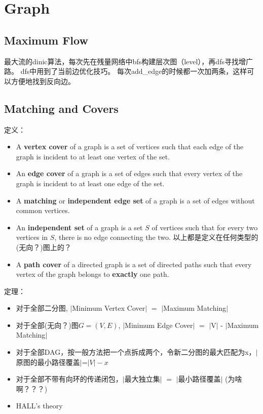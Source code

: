 \documentclass[twoside, UTF8]{article}
\begin{document}
	\section{Graph}
		\subsection{Maximum Flow}
			\begin{flushleft}
				最大流的dinic算法，每次先在残量网络中bfs构建层次图（level），再dfs寻找增广路。
				\linebreak dfs中用到了当前边优化技巧。
				\linebreak 每次add\_edge的时候都一次加两条，这样可以方便地找到反向边。
			\end{flushleft}
			
			
		\newpage
		\subsection{Matching and Covers}
			\begin{flushleft}
				定义：
				\begin{itemize}
					\item A \textbf{vertex cover} of a graph is a set of vertices such that each edge of the graph is incident to at least one vertex of the set.
					\item An \textbf{edge cover} of a graph is a set of edges such that every vertex of the graph is incident to at least one edge of the set.
					\item A \textbf{matching} or \textbf{independent edge set} of a graph is a set of edges without common vertices.
					\item An \textbf{independent set} of a graph is a set $S$ of vertices such that for every two vertices in $S$, there is no edge connecting the two.
					\linebreak 以上都是定义在任何类型的{\tiny (无向？)}图上的？
					\item A \textbf{path cover} of a directed graph is a set of directed paths such that every vertex of the graph belongs to \textbf{exactly} one path.
				\end{itemize}
			\end{flushleft}
		
			\begin{flushleft}
				定理：
				\begin{itemize}
					\item 对于全部二分图, $|$Minimum Vertex Cover$|$ $=$ $|$Maximum Matching$|$
					\item 对于全部{\tiny (无向？)}图$G=(V,E)$, $|$Minimum Edge Cover$|$ $=$ $|$V$|$ - $|$Maximum Matching$|$
					\item 对于全部DAG，按一般方法把一个点拆成两个，令新二分图的最大匹配为x，$|$原图的最小路径覆盖$|$=$|V| - x$
					\item 对于全部不带有向环的传递闭包，$|$最大独立集$|$ $=$ $|$最小路径覆盖$|$ (为啥啊？？？)
					\item HALL's theory
				\end{itemize}
			\end{flushleft}
			
\end{document}
